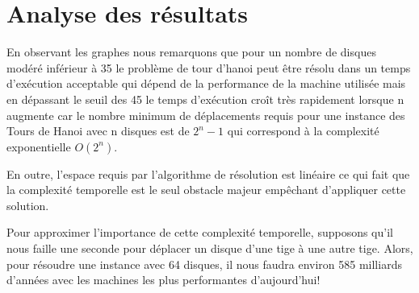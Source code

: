 \section{Analyse des résultats}
\par En observant  les graphes nous remarquons que pour un nombre de disques modéré inférieur à 35  le problème de tour d’hanoi peut être résolu dans un temps d'exécution acceptable qui dépend de la performance de la machine utilisée mais en dépassant  le seuil des 45 le temps d'exécution croît très rapidement lorsque n augmente car  le nombre minimum de déplacements requis pour une instance des Tours de Hanoi avec n disques est de $2^n - 1$ qui correspond à la complexité exponentielle $O(2^n)$.
\par En outre, l’espace requis par l'algorithme de résolution est linéaire ce qui fait que la complexité temporelle est le seul obstacle majeur empêchant d'appliquer cette solution.
\par Pour approximer  l'importance de cette complexité temporelle, supposons qu'il nous faille une seconde pour déplacer un disque d'une tige à une autre tige. Alors, pour résoudre une instance avec 64 disques, il nous faudra environ 585 milliards d'années avec les machines les plus performantes d'aujourd'hui!
